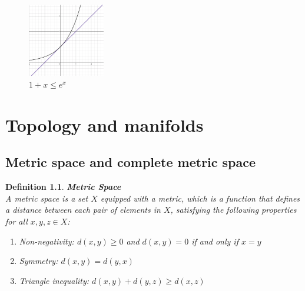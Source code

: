 \documentclass[11pt]{book} %
\newtheorem{definition}{Definition}[section]
\begin{document}
\begin{figure}[H]
    \centering
    \includegraphics[width=0.3\textwidth]{Figs/1+x_leq_e^x.png}
    \caption{$1 + x \leq e^x$}
\end{figure}





\chapter{Topology and manifolds}

\section{Metric space and complete metric space}

\begin{definition}{\textbf{Metric Space}} \\
    A metric space is a set \( X \) equipped with a metric, which is a function that defines a distance between each pair of elements in \( X \), satisfying the following properties for all \( x, y, z \in X \):
    \begin{enumerate}
        \item Non-negativity: \( d(x, y) \geq 0 \) and \( d(x, y) = 0 \) if and only if \( x = y \)
        \item Symmetry: \( d(x, y) = d(y, x) \)
        \item Triangle inequality: \( d(x, y) + d(y, z) \geq d(x, z) \)
    \end{enumerate}
\end{definition}
\end{document}
